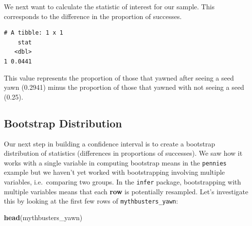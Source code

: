 \documentclass[]{article}
\newenvironment{Shaded}{\begin{snugshade}}{\end{snugshade}}
\newcommand{\KeywordTok}[1]{\textcolor[rgb]{0.13,0.29,0.53}{\textbf{#1}}}
\newcommand{\DataTypeTok}[1]{\textcolor[rgb]{0.13,0.29,0.53}{#1}}
\newcommand{\StringTok}[1]{\textcolor[rgb]{0.31,0.60,0.02}{#1}}
\newcommand{\CommentTok}[1]{\textcolor[rgb]{0.56,0.35,0.01}{\textit{#1}}}
\newcommand{\OperatorTok}[1]{\textcolor[rgb]{0.81,0.36,0.00}{\textbf{#1}}}
\newcommand{\NormalTok}[1]{#1}
\begin{document}
We next want to calculate the statistic of interest for our sample. This
corresponds to the difference in the proportion of successes.

\begin{Shaded}
\end{Shaded}

\begin{verbatim}
# A tibble: 1 x 1
    stat
   <dbl>
1 0.0441
\end{verbatim}

This value represents the proportion of those that yawned after seeing a
seed yawn (0.2941) minus the proportion of those that yawned with not
seeing a seed (0.25).

\subsection{Bootstrap Distribution}\label{bootstrap-distribution}

Our next step in building a confidence interval is to create a bootstrap
distribution of statistics (differences in proportions of successes). We
saw how it works with a single variable in computing bootstrap means in
the \texttt{pennies} example but we haven't yet worked with
bootstrapping involving multiple variables, i.e.~comparing two groups.
In the \texttt{infer} package, bootstrapping with multiple variables
means that each \textbf{row} is potentially resampled. Let's investigate
this by looking at the first few rows of \texttt{mythbusters\_yawn}:

\begin{Shaded}
\begin{Highlighting}[]
\KeywordTok{head}\NormalTok{(mythbusters_yawn)}
\end{Highlighting}
\end{Shaded}
\end{document}
